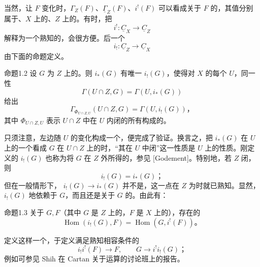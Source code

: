 当然，让 $F$ 变化时，$\Gamma_Z(F)$、$\underline{\Gamma}_Z(F)$、$i^!(F)$ 可以看成关于 $F$ 的，其值分别属于、$X$ 上的、$Z$ 上的。有时，把
\[
i^!:\underline C_X\longrightarrow\underline C_Z
\]
解释为一个熟知的，会很方便。后一个
\[
i_!:\underline C_Z\longrightarrow\underline C_X
\]
由下面的命题定义。
\begin{SGAresult}{命题}{1.2}
设 $G$ 为 $Z$ 上的。则 $i_*(G)$ 有唯一 $i_!(G)$，使得对 $X$ 的每个 $U$，同一性
\[
\Gamma(U\cap Z,G)=\Gamma(U,i_*(G))
\]
给出
\[
\Gamma_{\Phi_{U\cap Z,U}}(U\cap Z,G)=\Gamma(U,i_!(G))，
\]
其中 $\Phi_{U\cap Z,U}$ 表示 $U\cap Z$ 中在 $U$ 内闭的所有构成的。
\end{SGAresult}
只须注意，左边随 $U$ 的变化构成一个，便完成了验证。换言之，把 $i_*(G)$ 在 $U$ 上的一个看成 $G$ 在 $U\cap Z$ 上的时，“其在 $U$ 中闭”这一性质是 $U$ 上的性质。刚定义的 $i_!(G)$ 也称为将 $G$ 在 $Z$ 外所得的，参见 [Godement]。特别地，若 $Z$ 闭，则
\[
i_!(G)=i_*(G)；\tag{9}
\]
但在一般情形下， $i_!(G)\to i_*(G)$ 并不是，这一点在 $Z$ 为时就已熟知。显然，$i_!(G)$ 地依赖于 $G$，而且还是关于 $G$ 的。由此有：
\begin{SGAresult}{命题}{1.3}
关于 $G,F$（其中 $G$ 是 $Z$ 上的，$F$ 是 $X$ 上的），存在的
\[
\operatorname{Hom}(i_!(G),F)=\operatorname{Hom}(G,i^!(F))。\tag{10}
\]
\end{SGAresult}
定义这样一个，于定义满足熟知相容条件的
\[
i_!i^!(F)\longrightarrow F,\qquad G\longrightarrow i^!i_!(G)；
\]
例如可参见 Shih 在 Cartan 关于运算的讨论班上的报告。


